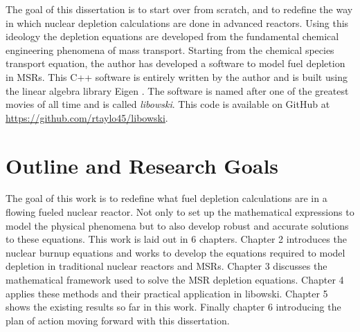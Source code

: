 The goal of this dissertation is to start over from scratch, and to redefine the way in which nuclear depletion calculations are done in advanced reactors. Using this ideology the depletion equations are developed from the fundamental chemical engineering phenomena of mass transport. Starting from the chemical species transport equation, the author has developed a software to model fuel depletion in MSRs. This C++ software is entirely written by the author and is built using the linear algebra library Eigen \cite{eigen}. The software is named after one of the greatest movies of all time and is called \textit{libowski}. This code is available on GitHub at \href{https://github.com/rtaylo45/libowski}{{\color{blue}https://github.com/rtaylo45/libowski}}.

\section{Outline and Research Goals}

The goal of this work is to redefine what fuel depletion calculations are in a flowing fueled nuclear reactor. Not only to set up the mathematical expressions to model the physical phenomena but to also develop robust and accurate solutions to these equations. This work is laid out in 6 chapters. Chapter 2 introduces the nuclear burnup equations and works to develop the equations required to model depletion in traditional nuclear reactors and MSRs. Chapter 3 discusses the mathematical framework used to solve the MSR depletion equations. Chapter 4 applies these methods  and their practical application in libowski. Chapter 5 shows the existing results so far in this work. Finally chapter 6 introducing the plan of action moving forward with this dissertation. 
